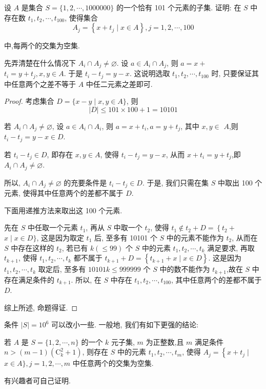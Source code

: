 \begin{example}
	设 $A$ 是集合 $S=\{1,2, \cdots, 1000000\}$ 的一个恰有 101 个元素的子集. 证明: 在 $S$ 中存在数 $t_{1}, t_{2}, \cdots, t_{100}$, 使得集合
	$$
		A_{j}=\left\{x+t_{j} \mid x \in A\right\}, j=1,2, \cdots, 100
	$$

	中,每两个的交集为空集.
\end{example}
\begin{analysis}
	先弄清楚在什么情况下 $A_{i} \cap A_{j} \neq \varnothing$. 设 $a \in A_{i} \cap A_{j}$, 则 $a=x+$ $t_{i}=y+t_{j}, x, y \in A$. 于是 $t_{i}-t_{j}=y-x$. 这说明选取 $t_{1}, t_{2}, \cdots, t_{100}$ 时, 只要保证其中任意两个之差不等于 $A$ 中任二元素之差即可.
\end{analysis}

\begin{proof}
	考虑集合 $D=\{x-y \mid x, y \in A\}$, 则
	$$
		|D| \leqslant 101 \times 100+1=10101
	$$

	若 $A_{i} \cap A_{j} \neq \varnothing$, 设 $a \in A_{i} \cap A_{i}$, 则 $a=x+t_{i}, a=y+t_{j}$, 其中 $x, y \in$ $A$,则 $t_{i}-t_{j}=y-x \in D$.

	若 $t_{i}-t_{j} \in D$, 即存在 $x, y \in A$, 使得 $t_{i}-t_{j}=y-x$, 从而 $x+t_{i}=y+t_{j}$,即 $A_{i} \cap A_{j} \neq \varnothing$.

	所以, $A_{i} \cap A_{j} \neq \varnothing$ 的充要条件是 $t_{i}-t_{j} \in D$. 于是, 我们只需在集 $S$ 中取出 100 个元素, 使得其中任意两个的差都不属于 $D$.

	下面用递推方法来取出这 100 个元素.

	先在 $S$ 中任取一个元素 $t_{1}$, 再从 $S$ 中取一个 $t_{2}$, 使得 $t_{1} \notin t_{2}+D=\left\{t_{2}+\right.$ $x \mid x \in D\}$, 这是因为取定 $t_{1}$ 后, 至多有 10101 个 $S$ 中的元素不能作为 $t_{2}$, 从而在 $S$ 中存在这样的 $t_{2}$, 若已有 $k(\leqslant 99)$ 个 $S$ 中的元素 $t_{1}, t_{2}, \cdots, t_{k}$ 满足要求, 再取 $t_{k+1}$, 使得 $t_{1}, t_{2}, \cdots, t_{k}$ 都不属于 $t_{k+1}+D=\left\{t_{k+1}+x \mid x \in D\right\}$. 这是因为 $t_{1}, t_{2}, \cdots, t_{k}$ 取定后, 至多有 $10101 k \leqslant 999999$ 个 $S$ 中的数不能作为 $t_{k+1}$,故在 $S$ 中存在满足条件的 $t_{k+1}$. 所以, 在 $S$ 中存在 $t_{1}, t_{2}, \cdots, t_{100}$, 其中任意两个的差都不属于 $D$.

	综上所述, 命题得证.
\end{proof}

\begin{note}
	条件 $|S|=10^{6}$ 可以改小一些. 一般地, 我们有如下更强的结论:

	若 $A$ 是 $S=\{1,2, \cdots, n\}$ 的一个 $k$ 元子集, $m$ 为正整数,且 $m$ 满足条件 $n>(m-1)\left(\mathrm{C}_{k}^{2}+1\right)$, 则存在 $S$ 中的元素 $t_{1}, t_{2}, \cdots, t_{m}$, 使得 $A_{j}=\left\{x+t_{j} \mid\right.$ $x \in A\}, j=1,2, \cdots, m$ 中任意两个的交集为空集.

	有兴趣者可自己证明.
\end{note}

